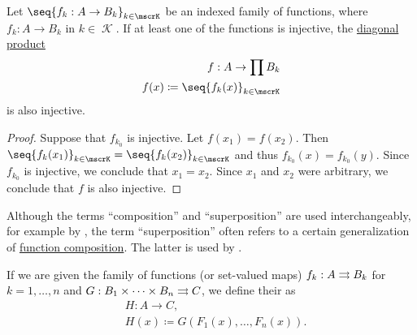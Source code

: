 \begin{lemma}\label{thm:diagonal_product_injectivity}
  Let \( \seq{ f_k: A \to B_k }_{k \in \mscrK} \) be an indexed family of functions, where \( f_k: A \to B_k \) in \( k \in \mscrK \). If at least one of the functions is injective, the \hyperref[def:topological_product]{diagonal product}
  \begin{equation*}
    \begin{aligned}
      f: A \to \prod B_k \\
      f(x) \coloneqq \seq{ f_k(x) }_{k \in \mscrK}
    \end{aligned}
  \end{equation*}
  is also injective.
\end{lemma}
\begin{proof}
  Suppose that \( f_{k_0} \) is injective. Let \( f(x_1) = f(x_2) \). Then \( \seq{ f_k(x_1) }_{k \in \mscrK} = \seq{ f_k(x_2) }_{k \in \mscrK} \) and thus \( f_{k_0}(x) = f_{k_0}(y) \). Since \( f_{k_0} \) is injective, we conclude that \( x_1 = x_2 \). Since \( x_1 \) and \( x_2 \) were arbitrary, we conclude that \( f \) is also injective.
\end{proof}

\begin{concept}\label{con:function_superposition}
  Although the terms \enquote{composition} and \enquote{superposition} are used interchangeably, for example by , the term \enquote{superposition} often refers to a certain generalization of \hyperref[def:set_valued_map/composition]{function composition}. The latter is used by .

  If we are given the family of functions (or set-valued maps) \( f_k: A \rightrightarrows B_k \) for \( k = 1, \ldots, n \) and \( G: B_1 \times \cdots \times B_n \rightrightarrows C \), we define their  as
  \begin{equation*}
    \begin{aligned}
      &H: A \to C, \\
      &H(x) \coloneqq G(F_1(x), \ldots, F_n(x)).
    \end{aligned}
  \end{equation*}
\end{concept}

